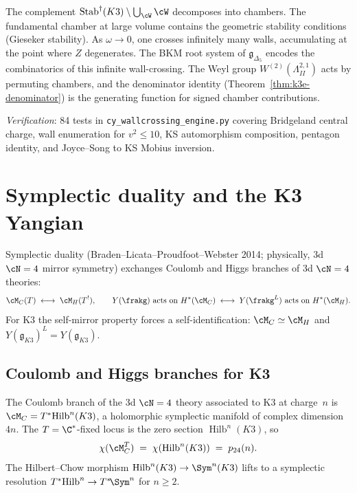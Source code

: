 \begin{remark}
\label{rem:k3e-stab-topology}
The complement $\mathrm{Stab}^\dagger(K3) \setminus \bigcup_{\cW} \cW$ decomposes into chambers. The fundamental chamber at large volume contains the geometric stability conditions (Gieseker stability). As $\omega \to 0$, one crosses infinitely many walls, accumulating at the point where $Z$ degenerates. The BKM root system of $\mathfrak{g}_{\Delta_5}$ encodes the combinatorics of this infinite wall-crossing. The Weyl group $W^{(2)}(\Lambda^{2,1}_{II})$ acts by permuting chambers, and the denominator identity (Theorem~\ref{thm:k3e-denominator}) is the generating function for signed chamber contributions.
\end{remark}

\noindent\textit{Verification}: 84 tests in \texttt{cy\_wallcrossing\_engine.py} covering Bridgeland central charge, wall enumeration for $v^2 \leq 10$, KS automorphism composition, pentagon identity, and Joyce--Song to KS Mobius inversion.


\section{Symplectic duality and the K3 Yangian}
\label{sec:k3e-symplectic-duality}

Symplectic duality (Braden--Licata--Proudfoot--Webster 2014; physically, 3d $\cN = 4$ mirror symmetry) exchanges Coulomb and Higgs branches of 3d $\cN = 4$ theories:
\[
  \cM_C(T) \;\longleftrightarrow\; \cM_H(T^!),
  \qquad
  Y(\frakg)\text{ acts on }H^*(\cM_C)
  \;\longleftrightarrow\;
  Y(\frakg^L)\text{ acts on }H^*(\cM_H).
\]
For K3 the self-mirror property forces a self-identification: $\cM_C \simeq \cM_H$ and $Y(\mathfrak{g}_{K3})^L = Y(\mathfrak{g}_{K3})$.

\subsection{Coulomb and Higgs branches for K3}
\label{subsec:k3e-coulomb-higgs}

\begin{conjecture}
\label{conj:k3e-coulomb-branch}
\ClaimStatusConjectured
The Coulomb branch of the 3d $\cN = 4$ theory associated to K3 at charge~$n$ is $\cM_C = T^*\!\operatorname{Hilb}^n(K3)$, a holomorphic symplectic manifold of complex dimension~$4n$.  The $T = \C^*$-fixed locus is the zero section $\operatorname{Hilb}^n(K3)$, so
\[
  \chi(\cM_C^T) \;=\; \chi(\operatorname{Hilb}^n(K3)) \;=\; p_{24}(n).
\]
The Hilbert--Chow morphism $\operatorname{Hilb}^n(K3) \to \Sym^n(K3)$ lifts to a symplectic resolution $T^*\!\operatorname{Hilb}^n \to T^*\!\Sym^n$ for $n \geq 2$.
\end{conjecture}


